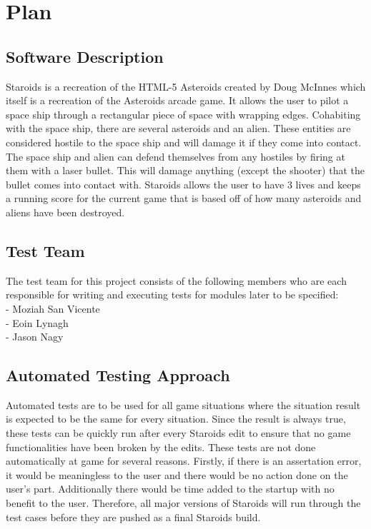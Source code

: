 \documentclass[12pt, titlepage]{article}
\begin{document}
\section{Plan}

\subsection{Software Description}
Staroids is a recreation of the HTML-5 Asteroids created by Doug McInnes which itself is a recreation of the Asteroids arcade game. It allows the user to pilot a space ship through a rectangular piece of space with wrapping edges. Cohabiting with the space ship, there are several asteroids and an alien. These entities are considered hostile to the space ship and will damage it if they come into contact. The space ship and alien can defend themselves from any hostiles by firing at them with a laser bullet. This will damage anything (except the shooter) that the bullet comes into contact with. Staroids allows the user to have 3 lives and keeps a running score for the current game that is based off of how many asteroids and aliens have been destroyed.

\subsection{Test Team}
The test team for this project consists of the following members who are each responsible for writing and executing tests for modules later to be specified:\\
- Moziah San Vicente\\
- Eoin Lynagh\\
- Jason Nagy\\ 

\subsection{Automated Testing Approach}
Automated tests are to be used for all game situations where the situation result is expected to be the same for every situation. Since the result is always true, these tests can be quickly run after every Staroids edit to ensure that no game functionalities have been broken by the edits. These tests are not done automatically at game for several reasons. Firstly, if there is an assertation error, it would be meaningless to the user and there would be no action done on the user's part. Additionally there would be time added to the startup with no benefit to the user. Therefore, all major versions of Staroids will run through the test cases before they are pushed as a final Staroids build.
\end{document}
